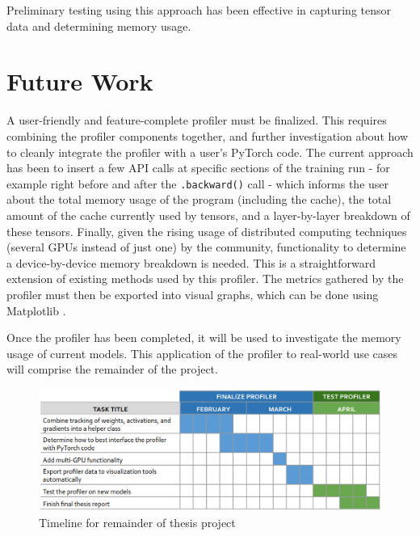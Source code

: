 \documentclass[12pt,letterpaper]{article}
\begin{document}
Preliminary testing using this approach has been effective in capturing tensor data and determining memory usage.
\par 

\section{Future Work}
\label{future_work}
A user-friendly and feature-complete profiler must be finalized. This requires combining the profiler components together, and further investigation about how to cleanly integrate the profiler with a user's PyTorch code. The current approach has been to insert a few API calls at specific sections of the training run - for example right before and after the \texttt{.backward()} call - which informs the user about the total memory usage of the program (including the cache), the total amount of the cache currently used by tensors, and a layer-by-layer breakdown of these tensors. Finally, given the rising usage of distributed computing techniques (several GPUs instead of just one) by the community, functionality to determine a device-by-device memory breakdown is needed. This is a straightforward extension of existing methods used by this profiler. The metrics gathered by the profiler must then be exported into visual graphs, which can be done using Matplotlib \cite{matplotlib}.
\par

Once the profiler has been completed, it will be used to investigate the memory usage of current models. This application of the profiler to real-world use cases will comprise the remainder of the project.
\begin{figure}[ht]
\centering
\includegraphics[width=.9\textwidth]{remaining_work_schedule.png}
\captionsetup{width=0.7\linewidth}
\caption{Timeline for remainder of thesis project}
\label{fig:thesis_timeline}
\end{figure}
\end{document}
